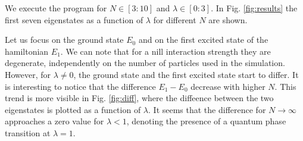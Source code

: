 \documentclass[rmp,10pt,onecolumn,fleqn,notitlepage]{revtex4-1}
\begin{document}
We execute the program for $N\in[3:10]$ and \( \lambda \in[0:3] \).
In Fig. \ref{fig:results} the first seven eigenstates as a function of $\lambda$ for different $N$ are shown.

Let us focus on the ground state $E_0$ and on the first excited state of the hamiltonian $E_1$. We can note that for a nill interaction strength they are degenerate, independently on the number of particles used in the simulation.
However, for \( \lambda \neq 0 \), the ground state and the first excited state start to differ. It is interesting to notice that the difference $E_1-E_0$ decrease with higher $N$. This trend is more visible in Fig. \ref{fig:diff}, where the diffeence between the two eigenstates is plotted as a function of \( \lambda  \). It seems that the difference for \( N \rightarrow \infty  \) approaches a zero value for \( \lambda < 1 \), denoting the presence of a quantum phase transition at \( \lambda =1 \).
\end{document}
